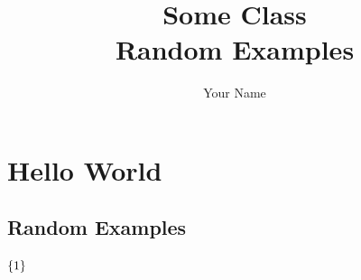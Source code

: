 \documentclass{report}
\title{\Huge{Some Class}\\Random Examples}
\author{\huge{Your Name}}
\date{}
\DeclarePairedDelimiter\set{\{}{\}}
\begin{document}
\maketitle
\newpage%
\tableofcontents
\pagebreak

\chapter{Hello World}
\section{Random Examples}

$\set{1}$
\end{document}
